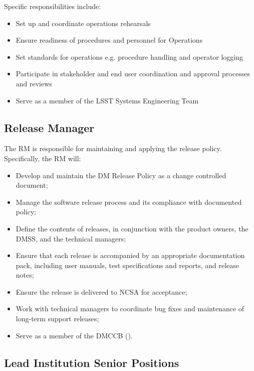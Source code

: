 Specific responsibilities include:

\begin{itemize}
\item Set up and coordinate operations rehearsals
\item Ensure readiness of procedures and personnel for \gls{Operations}
\item Set standards for operations e.g. procedure handling and operator logging
\item Participate in stakeholder and end user coordination and approval processes and reviews
\item Serve as a member of the \gls{LSST} \gls{Systems Engineering} Team
\end{itemize}

\subsection{Release Manager}\label{role:dmrm}

The \gls{RM} is responsible for maintaining and applying the release policy.
Specifically, the \gls{RM} will:

\begin{itemize}

  \item{Develop and maintain the \gls{DM} \gls{Release} Policy as a change controlled
  document;}
  \item{Manage the software release process and its compliance with documented
  policy;}
  \item{Define the contents of releases, in conjunction with the product
  owners, the \gls{DMSS}, and the technical managers;}
  \item{Ensure that each release is accompanied by an appropriate
  documentation pack, including user manuals, test specifications and reports,
  and release notes;}
  \item{Ensure the release is delivered to \gls{NCSA} for acceptance;}
  \item{Work with technical managers to coordinate bug fixes and maintenance
  of long-term support releases;}
  \item{Serve as a member of the \gls{DMCCB} ().}

\end{itemize}

\subsection{Lead Institution Senior Positions}

